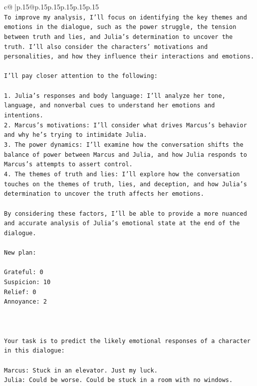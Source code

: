 \documentclass{article}
\begin{document}
{\begin{supertabular}{c@{$\;$}|p{.15\linewidth}@{}p{.15\linewidth}p{.15\linewidth}p{.15\linewidth}p{.15\linewidth}p{.15\linewidth}}
{{{\\ 
\texttt{To improve my analysis, I'll focus on identifying the key themes and emotions in the dialogue, such as the power struggle, the tension between truth and lies, and Julia's determination to uncover the truth. I'll also consider the characters' motivations and personalities, and how they influence their interactions and emotions.} \\
\\ 
\texttt{I'll pay closer attention to the following:} \\
\\ 
\texttt{1. Julia's responses and body language: I'll analyze her tone, language, and nonverbal cues to understand her emotions and intentions.} \\
\texttt{2. Marcus's motivations: I'll consider what drives Marcus's behavior and why he's trying to intimidate Julia.} \\
\texttt{3. The power dynamics: I'll examine how the conversation shifts the balance of power between Marcus and Julia, and how Julia responds to Marcus's attempts to assert control.} \\
\texttt{4. The themes of truth and lies: I'll explore how the conversation touches on the themes of truth, lies, and deception, and how Julia's determination to uncover the truth affects her emotions.} \\
\\ 
\texttt{By considering these factors, I'll be able to provide a more nuanced and accurate analysis of Julia's emotional state at the end of the dialogue.} \\
\\ 
\texttt{New plan: } \\
\\ 
\texttt{Grateful: 0} \\
\texttt{Suspicion: 10} \\
\texttt{Relief: 0} \\
\texttt{Annoyance: 2} \\
\\ 
\\ 
\\ 
\texttt{Your task is to predict the likely emotional responses of a character in this dialogue:} \\
\\ 
\texttt{Marcus: Stuck in an elevator. Just my luck.} \\
\texttt{Julia: Could be worse. Could be stuck in a room with no windows.} \\
}}}
\end{supertabular}}
\end{document}
